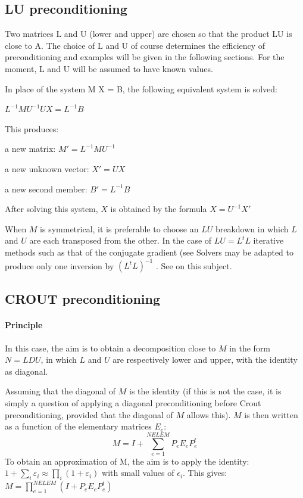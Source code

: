 \subsection{LU preconditioning}

Two matrices L and U (lower and upper) are chosen so that the product LU is
close to A. The choice of L and U of course determines the efficiency of
preconditioning and examples will be given in the following sections. For the
moment, L and U will be assumed to have known values.

In place of the system M X = B, the following equivalent system is solved:

$L^{-1} M U^{-1} U X  =  L^{-1} B$



This produces:



a new matrix: $M' = L^{-1} M U^{-1}$

a new unknown vector: $X' = U X$

a new second member: $B' = L^{-1} B$



After solving this system, $X$ is obtained by the formula $X = U^{-1} X'$

When $M$ is symmetrical, it is preferable to choose an $LU$ breakdown in which
$L$ and $U$ are each transposed from the other. In the case of $LU = L^{t}L$
iterative methods such as that of the conjugate gradient (see
Solvers may be adapted to produce only one inversion by
$(L^{t}L)^{-1}$ . See \citet{Hervouet1911} on this subject.

\subsection{CROUT preconditioning}

\paragraph{Principle}

In this case, the aim is to obtain a decomposition close to $M$ in the form $N
= LDU$, in which $L$ and $U$ are respectively lower and upper, with the
identity as diagonal.

Assuming that the diagonal of $M$ is the identity (if this is not the case, it is
simply a question of applying a diagonal preconditioning before Crout
preconditioning, provided that the diagonal of $M$ allows this). $M$ is then
written as a function of the elementary matrices $E_{e}$:
\[M=I+\sum _{e=1}^{NELEM}P_{e} E_{e} P_{e}^{t}  \]
To obtain an approximation of M, the aim is to apply the identity:
$1+\sum _{i}\varepsilon _{i}  \approx \prod _{i}(1+\varepsilon _{i} ) $ with
small values of $\epsilon _{i}$. This gives: $M=\prod _{e=1}^{NELEM}(I+P_{e} E_{e} P_{e}^{t}
) $

